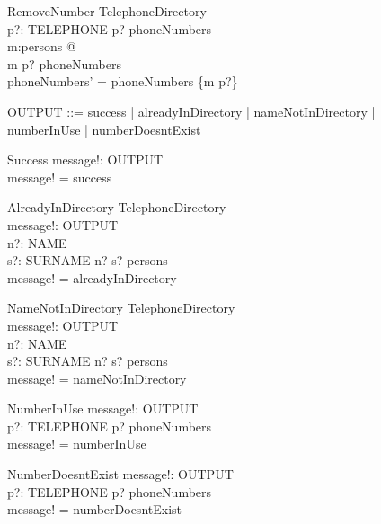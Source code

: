 \documentclass{article}
\begin{document}
\begin{schema}{RemoveNumber}
\Delta TelephoneDirectory \\
p?: TELEPHONE
\where
p? \in \ran phoneNumbers \\
\exists m:\dom persons @ \\
m \mapsto p? \in phoneNumbers \land \\
phoneNumbers' = phoneNumbers \setminus \{m \mapsto p?\} \\
\end{schema}

\begin{zed}
OUTPUT ::= success | alreadyInDirectory | nameNotInDirectory | \\
numberInUse | numberDoesntExist
\end{zed}

\begin{schema}{Success}
message!: OUTPUT \\
\where
message! = success
\end{schema}

\begin{schema}{AlreadyInDirectory}
\Xi TelephoneDirectory \\
message!: OUTPUT \\
n?: NAME \\
s?: SURNAME
\where
n? \mapsto s? \in persons \\
message! = alreadyInDirectory
\end{schema}

\begin{schema}{NameNotInDirectory}
\Xi TelephoneDirectory \\
message!: OUTPUT \\
n?: NAME \\
s?: SURNAME
\where
n? \mapsto s? \notin persons \\
message! = nameNotInDirectory
\end{schema}

\begin{schema}{NumberInUse}
message!: OUTPUT \\
p?: TELEPHONE
\where
p? \in  \ran phoneNumbers \\
message! = numberInUse
\end{schema}

\begin{schema}{NumberDoesntExist}
message!: OUTPUT \\
p?: TELEPHONE
\where
p? \notin \ran phoneNumbers \\
message! = numberDoesntExist
\end{schema}
\end{document}
